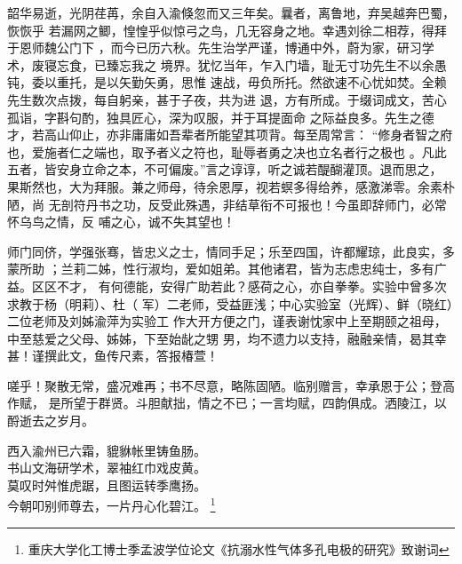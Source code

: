 \begin{ack}

韶华易逝，光阴荏苒，余自入渝倏忽而又三年矣。曩者，离鲁地，弃吴越奔巴蜀，恢恢乎
若漏网之鲫，惶惶乎似惊弓之鸟，几无容身之地。幸遇刘徐二相荐，得拜于恩师魏公门下
，而今已历六秋。先生治学严谨，博通中外，蔚为家，研习学术，废寝忘食，已臻忘我之
境界。犹忆当年，乍入门墙，耻无寸功先生不以余愚钝，委以重托，是以矢勤矢勇，思惟
速战，毋负所托。然欲速不心忧如焚。全赖先生数次点拨，每自躬亲，甚于子夜，共为进
退，方有所成。于缀词成文，苦心孤诣，字斟句酌，独具匠心，深为叹服，并于耳提面命
之际益良多。先生之德才，若高山仰止，亦非庸庸如吾辈者所能望其项背。每至周常言：
“修身者智之府也，爱施者仁之端也，取予者义之符也，耻辱者勇之决也立名者行之极也
。凡此五者，皆安身立命之本，不可偏废。”言之谆谆，听之诚若醍醐灌顶。退而思之，
果斯然也，大为拜服。兼之师母，待余恩厚，视若螟多得给养，感激涕零。余素朴陋，尚
无剖符丹书之功，反受此殊遇，非结草衔不可报也！今虽即辞师门，必常怀乌鸟之情，反
哺之心，诚不失其望也！

师门同侪，学强张骞，皆忠义之士，情同手足；乐至四国，许都耀琼，此良实，多蒙所助
；兰莉二姊，性行淑均，爱如姐弟。其他诸君，皆为志虑忠纯士，多有广益。区区不才，
有何德能，安得广助若此？感荷之心，亦自拳拳。实验中曾多次求教于杨（明莉）、杜（
军）二老师，受益匪浅；中心实验室（光辉）、鲜（晓红）二位老师及刘姊渝萍为实验工
作大开方便之门，谨表谢忱家中上至期颐之祖母，中至慈爱之父母、姊姊，下至始龀之甥
男，均不遗力以支持，融融亲情，曷其幸甚！谨撰此文，鱼传尺素，答报椿萱！

嗟乎！聚散无常，盛况难再；书不尽意，略陈固陋。临别赠言，幸承恩于公；登高作赋，
是所望于群贤。斗胆献拙，情之不已；一言均赋，四韵俱成。洒陵江，以酹逝去之岁月。

\begin{center}
西入渝州已六霜，貔貅帐里铸鱼肠。\\
书山文海研学术，翠袖红巾戏皮黄。\\
莫叹时舛惟虎踞，且图运转季鹰扬。\\
今朝叩别师尊去，一片丹心化碧江。
\footnote{重庆大学化工博士季孟波学位论文《抗溺水性气体多孔电极的研究》致谢词}
\end{center}

\end{ack}
